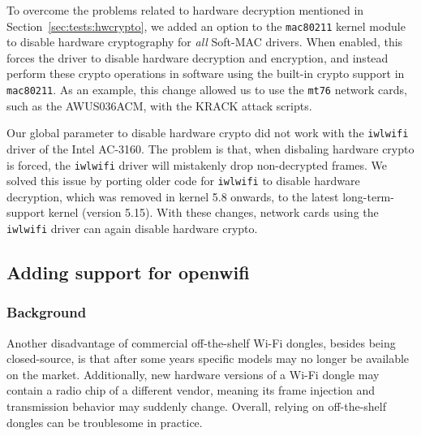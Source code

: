 \documentclass[sigconf]{acmart}
\newcommand{\wifi}{\mbox{Wi-Fi}}
\newcommand{\red}[1]{\textcolor{red}{#1}}
\begin{document}
To overcome the problems related to hardware decryption mentioned in Section~\ref{sec:tests:hwcrypto},
we added an option to the \verb|mac80211| kernel module to disable hardware cryptography for \emph{all} Soft-MAC drivers.
When enabled, this forces the driver to disable hardware decryption and encryption, and instead perform these crypto operations in software using the built-in crypto support in \verb|mac80211|.
As an example, this change allowed us to use the \verb|mt76| network cards, such as the AWUS036ACM, with the KRACK attack scripts.

Our global parameter to disable hardware crypto did not work with the \verb|iwlwifi| driver of the Intel AC-3160.
The problem is that, when disbaling hardware crypto is forced, the \verb|iwlwifi| driver will mistakenly drop non-decrypted frames.
We solved this issue by porting older code for \verb|iwlwifi| to disable hardware decryption, which was removed in kernel 5.8 onwards, to the latest long-term-support kernel (version 5.15).
With these changes, network cards using the \verb|iwlwifi| driver can again disable hardware crypto.


\subsection{Adding support for openwifi}

\subsubsection{Background}

Another disadvantage of commercial off-the-shelf \wifi{} dongles, besides being closed-source, is that after some years specific models may no longer be available on the market.
Additionally, new hardware versions of a \wifi{} dongle may contain a radio chip of a different vendor, meaning its frame injection and transmission behavior may suddenly change.
Overall, relying on off-the-shelf dongles can be troublesome in practice.
\end{document}
